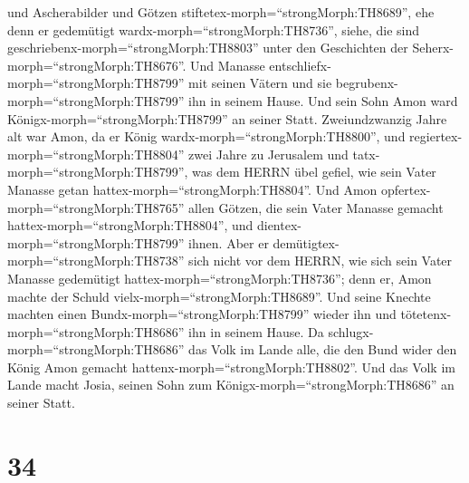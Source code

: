 und Ascherabilder und Götzen stiftetex-morph=``strongMorph:TH8689'', ehe
denn er gedemütigt wardx-morph=``strongMorph:TH8736'', siehe, die sind
geschriebenx-morph=``strongMorph:TH8803'' unter den Geschichten der
Seherx-morph=``strongMorph:TH8676''.  Und Manasse
entschliefx-morph=``strongMorph:TH8799'' mit seinen Vätern und sie
begrubenx-morph=``strongMorph:TH8799'' ihn in seinem Hause. Und sein
Sohn Amon ward Königx-morph=``strongMorph:TH8799'' an seiner Statt.
 Zweiundzwanzig Jahre alt war Amon, da er König
wardx-morph=``strongMorph:TH8800'', und
regiertex-morph=``strongMorph:TH8804'' zwei Jahre zu Jerusalem
 und tatx-morph=``strongMorph:TH8799'', was dem HERRN übel
gefiel, wie sein Vater Manasse getan
hattex-morph=``strongMorph:TH8804''. Und Amon
opfertex-morph=``strongMorph:TH8765'' allen Götzen, die sein Vater
Manasse gemacht hattex-morph=``strongMorph:TH8804'', und
dientex-morph=``strongMorph:TH8799'' ihnen.  Aber er
demütigtex-morph=``strongMorph:TH8738'' sich nicht vor dem HERRN, wie
sich sein Vater Manasse gedemütigt hattex-morph=``strongMorph:TH8736'';
denn er, Amon machte der Schuld vielx-morph=``strongMorph:TH8689''.
 Und seine Knechte machten einen
Bundx-morph=``strongMorph:TH8799'' wieder ihn und
tötetenx-morph=``strongMorph:TH8686'' ihn in seinem Hause. 
Da schlugx-morph=``strongMorph:TH8686'' das Volk im Lande alle, die den
Bund wider den König Amon gemacht hattenx-morph=``strongMorph:TH8802''.
Und das Volk im Lande macht Josia, seinen Sohn zum
Königx-morph=``strongMorph:TH8686'' an seiner Statt.

\hypertarget{section-33}{%
\section{34}\label{section-33}}

